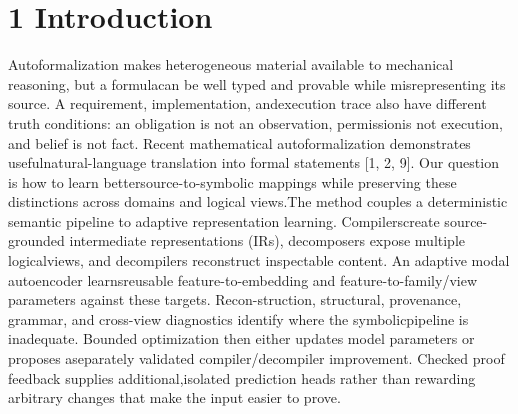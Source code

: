 \section*{1  Introduction}
\noindent
Autoformalization makes heterogeneous material available to mechanical reasoning, but a formula\linebreak[4]
can be well typed and provable while misrepresenting its source. A requirement, implementation, and\linebreak[4]
execution trace also have different truth conditions: an obligation is not an observation, permission\linebreak[4]
is not execution, and belief is not fact. Recent mathematical autoformalization demonstrates useful\linebreak[4]
natural-language translation into formal statements [1, 2, 9]. Our question is how to learn better\linebreak[4]
source-to-symbolic mappings while preserving these distinctions across domains and logical views.\linebreak[4]
The method couples a deterministic semantic pipeline to adaptive representation learning. Compilers\linebreak[4]
create source-grounded intermediate representations (IRs), decomposers expose multiple logical\linebreak[4]
views, and decompilers reconstruct inspectable content. An adaptive modal autoencoder learns\linebreak[4]
reusable feature-to-embedding and feature-to-family/view parameters against these targets. Recon-\linebreak[4]
struction, structural, provenance, grammar, and cross-view diagnostics identify where the symbolic\linebreak[4]
pipeline is inadequate. Bounded optimization then either updates model parameters or proposes a\linebreak[4]
separately validated compiler/decompiler improvement. Checked proof feedback supplies additional,\linebreak[4]
isolated prediction heads rather than rewarding arbitrary changes that make the input easier to prove.\par

